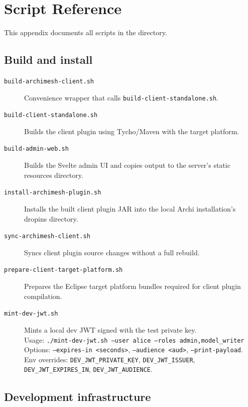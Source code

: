 \section{Script Reference}
\label{sec:AppendixScripts}

This appendix documents all scripts in the  directory.

\subsection{Build and install}

\begin{description}
\item[\texttt{build-archimesh-client.sh}]
  Convenience wrapper that calls \texttt{build-client-standalone.sh}.

\item[\texttt{build-client-standalone.sh}]
  Builds the client plugin using Tycho/Maven with the target platform.

\item[\texttt{build-admin-web.sh}]
  Builds the Svelte admin UI and copies output to the server's static
  resources directory.

\item[\texttt{install-archimesh-plugin.sh}]
  Installs the built client plugin JAR into the local Archi installation's
  dropins directory.

\item[\texttt{sync-archimesh-client.sh}]
  Syncs client plugin source changes without a full rebuild.

\item[\texttt{prepare-client-target-platform.sh}]
  Prepares the Eclipse target platform bundles required for client plugin
  compilation.

\item[\texttt{mint-dev-jwt.sh}]
  Mints a local dev JWT signed with the test private key.\\
  Usage: \texttt{./mint-dev-jwt.sh --user alice --roles admin,model\_writer}\\
  Options: \texttt{--expires-in <seconds>}, \texttt{--audience <aud>},
  \texttt{--print-payload}.\\
  Env overrides: \texttt{DEV\_JWT\_PRIVATE\_KEY}, \texttt{DEV\_JWT\_ISSUER},
  \texttt{DEV\_JWT\_EXPIRES\_IN}, \texttt{DEV\_JWT\_AUDIENCE}.
\end{description}

\subsection{Development infrastructure}

